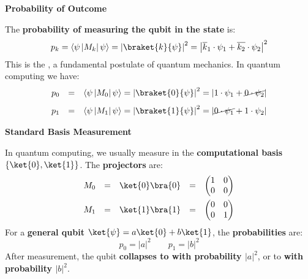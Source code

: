 \highspace
\begin{flushleft}
  \textcolor{Green3}{ \textbf{Probability of Outcome}}
\end{flushleft}
The \textbf{probability of measuring the qubit in the state}  is:
\begin{equation}\label{eq: Born rule}
  p_{k} = \left\langle \psi \left| M_{k} \right| \psi \right\rangle = \left|\braket{k}{\psi}\right|^{2} =
  \left| \overline{k}_{1} \cdot \psi_{1} + \overline{k_{2}} \cdot \psi_{2} \right|^{2}
\end{equation}
This is the , a fundamental postulate of quantum mechanics. In quantum computing we have:
\begin{equation*}
  \begin{array}{rcl}
    p_{0} &=& \left\langle \psi \left|M_{0}\right| \psi \right\rangle = \left|\braket{0}{\psi}\right|^{2} = \left|1 \cdot \psi_{1} + \cancel{0 \cdot \psi_{2}} \right| \\ [.8em]
    p_{1} &=& \left\langle \psi \left|M_{1}\right| \psi \right\rangle = \left|\braket{1}{\psi}\right|^{2} = \left|\cancel{0 \cdot \psi_{1}} + 1 \cdot \psi_{2} \right|
  \end{array}
\end{equation*}

\highspace
\begin{flushleft}
  \textcolor{Green3}{ \textbf{Standard Basis Measurement}}
\end{flushleft}
In quantum computing, we usually measure in the \textbf{computational basis}\break $\left\{\ket{0}, \ket{1}\right\}$. The \textbf{projectors} are:
\begin{equation}
  \begin{array}{rclcl}
    M_{0} &=& \ket{0}\bra{0} &=& \begin{pmatrix}
      1 & 0 \\
      0 & 0
    \end{pmatrix} \\ [1em]
    M_{1} &=& \ket{1}\bra{1} &=& \begin{pmatrix}
      0 & 0 \\
      0 & 1
    \end{pmatrix}
  \end{array}
\end{equation}
For a \textbf{general qubit} $\ket{\psi} = a\ket{0} + b\ket{1}$, the \textbf{probabilities} are:
\begin{equation}
  p_{0} = \left|a\right|^{2} \hspace{2em} p_{1} = \left|b\right|^{2}
\end{equation}
After measurement, the qubit \textbf{collapses to  with probability $\left|a\right|^{2}$}, or to \textbf{ with probability $\left|b\right|^{2}$}.


